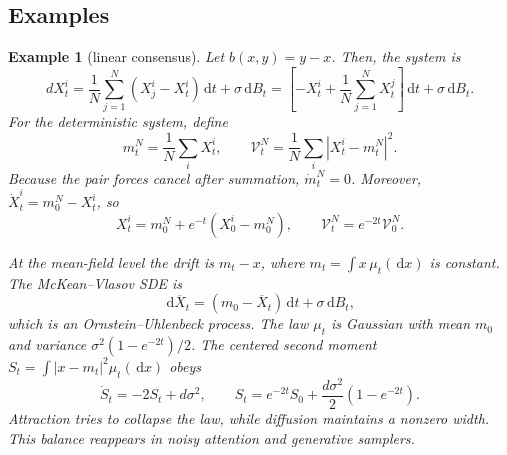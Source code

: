 \documentclass[11pt]{amsart}
\numberwithin{equation}{section}
\theoremstyle{plain}
\newtheorem{example}[theorem]{Example}
\newcommand{\dd}{\,\mathrm{d}}
\newcommand{\abs}[1]{\left\lvert#1\right\rvert}
\begin{document}
\subsection{Examples}

\begin{example}[linear consensus]
Let $b(x,y)=y-x$. Then, the system is 
$$
dX_t^i= \frac 1 N \sum_{j=1}^N (X_j^i - X_t^i) \dd t+\sigma\dd B_t = [ - X_t^i + \frac 1 N  \sum_{j=1}^N  X_t^j] \dd t+\sigma\dd B_t.
$$
  For the deterministic system, define
\[
  m_t^N=\frac1N\sum_iX_t^i,
  \qquad
  \mathcal V_t^N=\frac1N\sum_i\abs{X_t^i-m_t^N}^2.
\]
Because the pair forces cancel after summation, $\dot m_t^N=0$.  Moreover,
$\dot X_t^i=m_0^N-X_t^i$, so
\[
  X_t^i=m_0^N+e^{-t}(X_0^i-m_0^N),
  \qquad \mathcal V_t^N=e^{-2t}\mathcal V_0^N.
\]

At the mean-field level the drift is $m_t-x$, where
$m_t=\int x\,\mu_t(\dd x)$ is constant. The McKean--Vlasov SDE is
\[
  \dd\overline X_t=(m_0-\overline X_t)\dd t+\sigma\dd B_t, 
\] 
which is an Ornstein--Uhlenbeck process.  The law $\mu_t$ is Gaussian with mean $m_0$ and variance $\sigma^2(1-e^{-2t})/2$. 
The centered second moment
$S_t=\int\abs{x-m_t}^2\mu_t(\dd x)$ obeys
\[
  \dot S_t=-2S_t+d\sigma^2,
  \qquad
  S_t=e^{-2t}S_0+\frac{d\sigma^2}{2}(1-e^{-2t}).
\]
Attraction tries to collapse the law, while diffusion maintains a nonzero
width.  This balance reappears in noisy attention and generative samplers.

\end{example}
\end{document}
